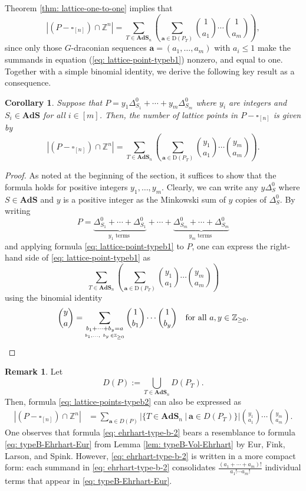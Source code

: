 \documentclass[12pt,reqno]{article}%
\newtheorem{cor}[thm]{Corollary}
\theoremstyle{definition}
\newtheorem{rem}[thm]{Remark}
\numberwithin{equation}{section}
\newcommand{\bba}{\mathbf{a}}
\newcommand{\Z}{\mathbb Z}
\newcommand{\ads}{\mathbf{AdS}}
\newcommand{\sym}{\Delta^0}
\begin{document}
Theorem \ref{thm: lattice-one-to-one} implies that
\begin{equation}\label{eq: lattice-point-typeb1}
    |(P - \square_{[n]})\cap \Z^n| = \sum_{T \in \ads_n}\left(\sum_{\bba \in \mathrm{D}(P_T)}\binom{1}{a_1}\cdots \binom{1}{a_m}\right),
\end{equation}
since only those $G$-draconian sequences $\bba = (a_1, \dots, a_m)$ with $a_i \leq 1$ make the summands in equation (\ref{eq: lattice-point-typeb1}) nonzero, and equal to one. Together with a simple binomial identity, we derive the following key result as a consequence.
\begin{cor}\label{cor: ehrhart-typeb}
    Suppose that $P = y_1\Delta^0_{S_1} + \cdots + y_m\Delta^0_{S_m}$ where $y_i$ are integers and $S_i \in \ads$ for all $i \in [m]$. Then, the number of lattice points in $P - \square_{[n]}$ is given by
    \begin{equation}\label{eq: lattice-points-typeb2}
    |(P - \square_{[n]})\cap \Z^n| = \sum_{T \in \ads_n}\left(\sum_{\bba \in \mathrm{D}(P_T)}\binom{y_1}{a_1}\cdots \binom{y_m}{a_m}\right).
\end{equation}
\end{cor}

\begin{proof} As noted at the beginning of the section, it suffices to show that the formula holds for positive integers $y_1, \dots, y_m$. Clearly, we can write any $y\Delta^0_{S}$ where $S \in \ads$ and $y$ is a positive integer as the Minkowski sum of $y$ copies of $\sym_S.$ By writing 
\[P = \underbrace{\sym_{S_1} + \cdots +\sym_{S_1}}_{y_1 \text{ terms }} + \cdots + \underbrace{\sym_{S_m} + \cdots + \sym_{S_m}}_{y_m \text{ terms }}\]
and applying formula \eqref{eq: lattice-point-typeb1} to $P$, one can express the right-hand side of \eqref{eq: lattice-point-typeb1} as
\[\sum_{T \in \ads_n}\left(\sum_{\bba \in \mathrm{D}(P_T)}\binom{y_1}{a_1}\cdots \binom{y_m}{a_m}\right)\]
using the binomial identity
\[\binom{y}{a} = \sum_{\underset{b_1, \dots,\ b_y \,\in \Z_{\geq 0}}{b_1 + \cdots + b_y = a}} \binom{1}{b_1}\cdots \binom{1}{b_y} \ \ \text{ for all } a,y \in \Z_{\geq 0}.\qedhere\]
\end{proof}

\begin{rem}\label{rem: formula-compared-to-Eurs}
     Let $$D(P) := \bigcup_{T \in \ads_n}D(P_T).$$ Then, formula \eqref{eq: lattice-points-typeb2} can also be expressed as
    \begin{align}\label{eq: ehrhart-type-b-2}
        |(P - \square_{[n]})\cap \Z^n| 
        &= \sum_{\bba \in D(P)}|\{T \in \ads_n \ | \ \bba \in D(P_T)\}|\binom{y_1}{a_1}\cdots \binom{y_m}{a_m}.
    \end{align}
    One observes that formula \eqref{eq: ehrhart-type-b-2} bears a resemblance to formula \eqref{eq: typeB-Ehrhart-Eur} from Lemma \ref{lem: typeB-Vol-Ehrhart} by Eur, Fink, Larson, and Spink. However, \eqref{eq: ehrhart-type-b-2} is written in a more compact form: each summand in \eqref{eq: ehrhart-type-b-2} consolidates $\frac{(a_1 + \cdots + a_m)!}{a_1! \cdots a_m!}$ individual terms that appear in   \eqref{eq: typeB-Ehrhart-Eur}.
\end{rem}
\end{document}
